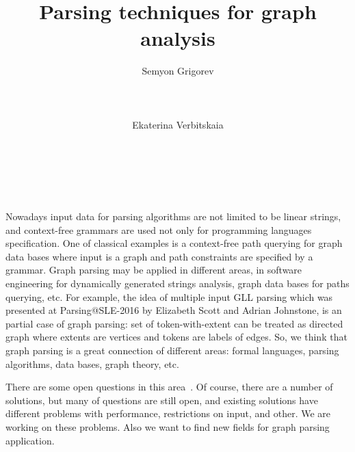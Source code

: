 \documentclass{vldb}
\begin{document}
\makeatletter
\def\@copyrightspace{\relax}
\makeatother


\title{Parsing techniques for graph analysis}



\author{
\alignauthor
       Semyon Grigorev\\
       \\
       \\
       \\
\alignauthor
       Ekaterina Verbitskaia\\
       \\
       \\
       \\
}


\maketitle

Nowadays input data for parsing algorithms are not limited to be linear strings, and context-free grammars are used not only for programming languages specification.
One of classical examples is a context-free path querying for graph data bases where input is a graph and path constraints are specified by a grammar.
Graph parsing may be applied in different areas, in software engineering for dynamically generated strings analysis, graph data bases for paths querying, etc.
For example, the idea of multiple input GLL parsing which was presented at Parsing@SLE-2016 by Elizabeth Scott and Adrian Johnstone, is an partial case of graph parsing: 
set of token-with-extent can be treated as directed graph where extents are vertices and tokens are labels of edges.
So, we think that graph parsing is a great connection of different areas: formal languages, parsing algorithms, data bases, graph theory, etc.

There are some open questions in this area~\cite{Hellings, Yannakakis}.
Of course, there are a number of solutions, but many of questions are still open, and existing solutions have different problems with performance, restrictions on input, and other.
We are working on these problems.
Also we want to find new fields for graph parsing application.
\end{document}
